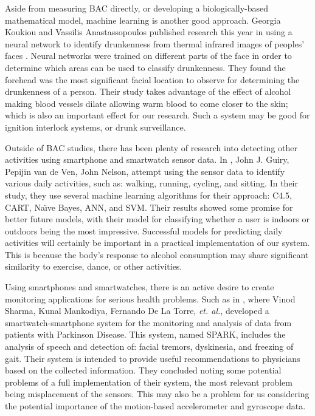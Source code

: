 Aside from measuring BAC directly, or developing a biologically-based mathematical model, machine learning is another good approach. Georgia Koukiou and Vassilis Anastassopoulos published research this year in using a neural network to identify drunkenness from thermal infrared images of peoples' faces \cite{Koukiou:2015}. Neural networks were trained on different parts of the face in order to determine which areas can be used to classify drunkenness. They found the forehead was the most significant facial location to observe for determining the drunkenness of a person. Their study takes advantage of the effect of alcohol making blood vessels dilate allowing warm blood to come closer to the skin; which is also an important effect for our research. Such a system may be good for ignition interlock systems, or drunk surveillance.

Outside of BAC studies, there has been plenty of research into detecting other activities using smartphone and smartwatch sensor data. In \cite{Guiry:2014}, John J. Guiry, Pepijin van de Ven, John Nelson, attempt using the sensor data to identify various daily activities, such as: walking, running, cycling, and sitting. In their study, they use several machine learning algorithms for their approach: C4.5, CART, Na\"{\i}ve Bayes, ANN, and SVM. Their results showed some promise for better future models, with their model for classifying whether a user is indoors or outdoors being the most impressive. Successful models for predicting daily activities will certainly be important in a practical implementation of our system. This is because the body's response to alcohol consumption may share significant similarity to exercise, dance, or other activities.

Using smartphones and smartwatches, there is an active desire to create monitoring applications for serious health problems. Such as in \cite{Sharma:2014}, where Vinod Sharma, Kunal Mankodiya, Fernando De La Torre, \textit{et. al.}, developed a smartwatch-smartphone system for the monitoring and analysis of data from patients with Parkinson Disease. This system, named SPARK, includes the analysis of speech and detection of: facial tremors, dyskinesia, and freezing of gait. Their system is intended to provide useful recommendations to physicians based on the collected information. They concluded noting some potential problems of a full implementation of their system, the most relevant problem being misplacement of the sensors. This may also be a problem for us considering the potential importance of the motion-based accelerometer and gyroscope data.